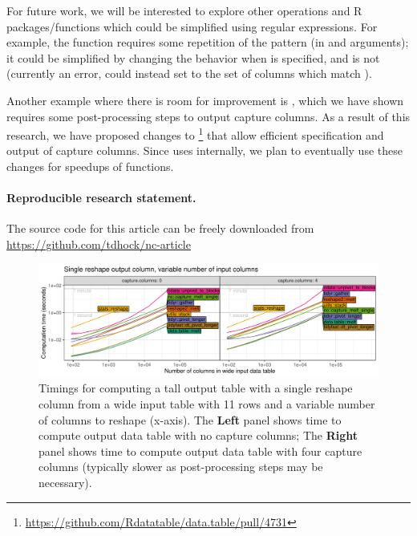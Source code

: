 For future work, we will be interested to explore other operations and
R packages/functions which could be simplified using regular
expressions. For example, the  function
requires some repetition of the pattern (in  and
 arguments); it could be simplified by changing the
behavior when  is specified, and  is
not (currently an error, could instead set  to the set of
columns which match ).

Another example where there is room for improvement is
, which we have shown requires some
post-processing steps to output capture columns. As a result of this
research, we have proposed changes to
\footnote{\url{https://github.com/Rdatatable/data.table/pull/4731}}
that allow efficient specification and output of capture
columns. Since  uses  internally, we plan to eventually use these
changes for speedups of  functions.

\paragraph{Reproducible research statement.} The source code for this
article can be freely downloaded from
\url{https://github.com/tdhock/nc-article}

\begin{figure}
  \centering
  \includegraphics[width = \textwidth]{figure-who-cols-new.pdf}
  \vskip -0.3cm
  \caption{
      \label{fig:timings-single-cols}
      Timings for computing a tall output table with a single reshape
      column from a wide input table with 11 rows and a variable
      number of columns to reshape (x-axis). The \textbf{Left} panel
      shows time to compute output data table with no capture columns;
      The \textbf{Right} panel shows time to compute output data table
      with four capture columns (typically slower as post-processing
      steps may be necessary).}
\end{figure}



\address{Toby Dylan Hocking\\
  School of Informatics, Computing, and Cyber Systems\\
  Northern Arizona University\\
  Flagstaff, Arizona\\
  USA\\
  \\
ORCID 0000-0002-3146-0865}

